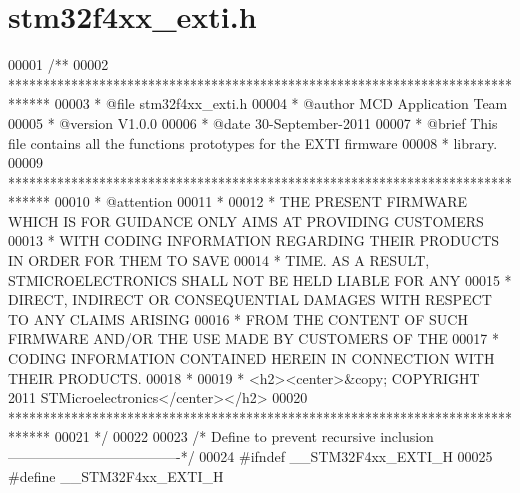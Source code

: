 \section{stm32f4xx\+\_\+exti.\+h}
\label{stm32f4xx__exti_8h_source}

\begin{DoxyCode}
00001 \textcolor{comment}{/**}
00002 \textcolor{comment}{  ******************************************************************************}
00003 \textcolor{comment}{  * @file    stm32f4xx\_exti.h}
00004 \textcolor{comment}{  * @author  MCD Application Team}
00005 \textcolor{comment}{  * @version V1.0.0}
00006 \textcolor{comment}{  * @date    30-September-2011}
00007 \textcolor{comment}{  * @brief   This file contains all the functions prototypes for the EXTI firmware}
00008 \textcolor{comment}{  *          library.}
00009 \textcolor{comment}{  ******************************************************************************}
00010 \textcolor{comment}{  * @attention}
00011 \textcolor{comment}{  *}
00012 \textcolor{comment}{  * THE PRESENT FIRMWARE WHICH IS FOR GUIDANCE ONLY AIMS AT PROVIDING CUSTOMERS}
00013 \textcolor{comment}{  * WITH CODING INFORMATION REGARDING THEIR PRODUCTS IN ORDER FOR THEM TO SAVE}
00014 \textcolor{comment}{  * TIME. AS A RESULT, STMICROELECTRONICS SHALL NOT BE HELD LIABLE FOR ANY}
00015 \textcolor{comment}{  * DIRECT, INDIRECT OR CONSEQUENTIAL DAMAGES WITH RESPECT TO ANY CLAIMS ARISING}
00016 \textcolor{comment}{  * FROM THE CONTENT OF SUCH FIRMWARE AND/OR THE USE MADE BY CUSTOMERS OF THE}
00017 \textcolor{comment}{  * CODING INFORMATION CONTAINED HEREIN IN CONNECTION WITH THEIR PRODUCTS.}
00018 \textcolor{comment}{  *}
00019 \textcolor{comment}{  * <h2><center>&copy; COPYRIGHT 2011 STMicroelectronics</center></h2>}
00020 \textcolor{comment}{  ******************************************************************************}
00021 \textcolor{comment}{  */}
00022 
00023 \textcolor{comment}{/* Define to prevent recursive inclusion -------------------------------------*/}
00024 \textcolor{preprocessor}{#}\textcolor{preprocessor}{ifndef} \textcolor{preprocessor}{\_\_STM32F4xx\_EXTI\_H}
00025 \textcolor{preprocessor}{#}\textcolor{preprocessor}{define} \textcolor{preprocessor}{\_\_STM32F4xx\_EXTI\_H}

\end{DoxyCode}
